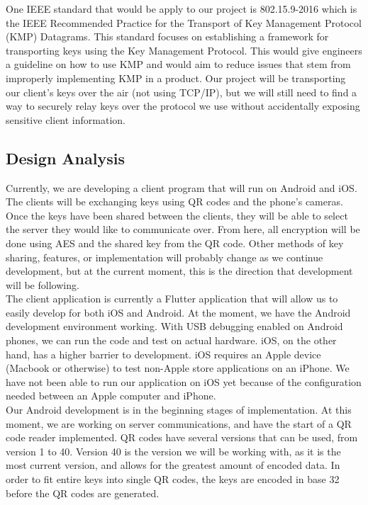 \documentclass[11pt]{article}
\begin{document}
    One IEEE standard that would be apply to our project is 802.15.9-2016 which is the IEEE Recommended Practice for the Transport of Key Management Protocol (KMP) Datagrams. This standard focuses on establishing a framework for transporting keys using the Key Management Protocol. This would give engineers a guideline on how to use KMP and would aim to reduce issues that stem from improperly implementing KMP in a product. Our project will be transporting our client’s keys over the air (not using TCP/IP), but we will still need to find a way to securely relay keys over the protocol we use without accidentally exposing sensitive client information.


\subsection{Design Analysis}
Currently, we are developing a client program that will run on Android and iOS. The clients will be exchanging keys using QR codes and the phone’s cameras. Once the keys have been shared between the clients, they will be able to select the server they would like to communicate over. From here, all encryption will be done using AES and the shared key from the QR code. Other methods of key sharing, features, or implementation will probably change as we continue development, but at the current moment, this is the direction that development will be following.\\

The client application is currently a Flutter application that will allow us to easily develop for both iOS and Android. At the moment, we have the Android development environment working. With USB debugging enabled on Android phones, we can run the code and test on actual hardware. iOS, on the other hand, has a higher barrier to development. iOS requires an Apple device (Macbook or otherwise) to test non-Apple store applications on an iPhone. We have not been able to run our application on iOS yet because of the configuration needed between an Apple computer and iPhone.\\

Our Android development is in the beginning stages of implementation. At this moment, we are working on server communications, and have the start of a QR code reader implemented. QR codes have several versions that can be used, from version 1 to 40. Version 40 is the version we will be working with, as it is the most current version, and allows for the greatest amount of encoded data. In order to fit entire keys into single QR codes, the keys are encoded in base 32 before the QR codes are generated. \\
\end{document}
